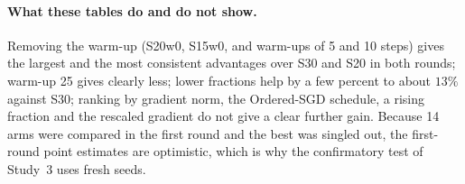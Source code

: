 \paragraph{What these tables do and do not show.} Removing the warm-up (S20w0, S15w0, and warm-ups of 5 and 10 steps) gives the largest and the most consistent advantages over S30 and S20 in both rounds; warm-up 25 gives clearly less; lower fractions help by a few percent to about $13\%$ against S30; ranking by gradient norm, the Ordered-SGD schedule, a rising fraction and the rescaled gradient do not give a clear further gain. Because 14 arms were compared in the first round and the best was singled out, the first-round point estimates are optimistic, which is why the confirmatory test of Study~3 uses fresh seeds.
